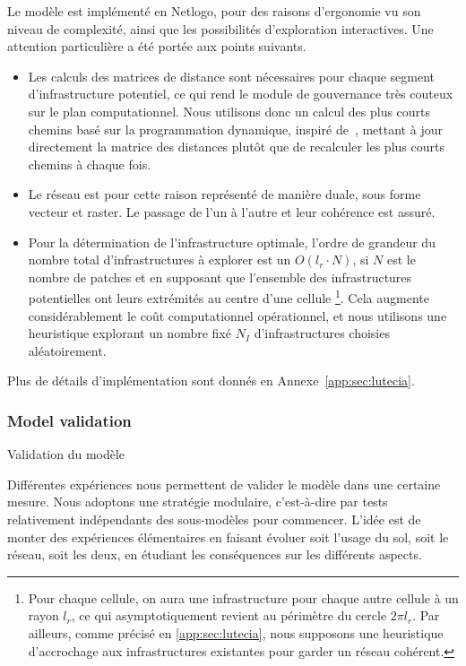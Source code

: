 Le modèle est implémenté en Netlogo, pour des raisons d'ergonomie vu son niveau de complexité, ainsi que les possibilités d'exploration interactives. Une attention particulière a été portée aux points suivants.
\begin{itemize}
	\item Les calculs des matrices de distance sont nécessaires pour chaque segment d'infrastructure potentiel, ce qui rend le module de gouvernance très couteux sur le plan computationnel. Nous utilisons donc un calcul des plus courts chemins basé sur la programmation dynamique, inspiré de~\cite{tretyakov2011fast}, mettant à jour directement la matrice des distances plutôt que de recalculer les plus courts chemins à chaque fois.
	\item Le réseau est pour cette raison représenté de manière duale, sous forme vecteur et raster. Le passage de l'un à l'autre et leur cohérence est assuré.
	\item Pour la détermination de l'infrastructure optimale, l'ordre de grandeur du nombre total d'infrastructures à explorer est un $O(l_r\cdot N)$, si $N$ est le nombre de patches et en supposant que l'ensemble des infrastructures potentielles ont leurs extrémités au centre d'une cellule \footnote{Pour chaque cellule, on aura une infrastructure pour chaque autre cellule à un rayon $l_r$, ce qui asymptotiquement revient au périmètre du cercle $2\pi l_r$. Par ailleurs, comme précisé en \ref{app:sec:lutecia}, nous supposons une heuristique d'accrochage aux infrastructures existantes pour garder un réseau cohérent.}. Cela augmente considérablement le coût computationnel opérationnel, et nous utilisons une heuristique explorant un nombre fixé $N_I$ d'infrastructures choisies aléatoirement.
\end{itemize}


Plus de détails d'implémentation sont donnés en Annexe~\ref{app:sec:lutecia}.




\subsubsection{Model validation}{Validation du modèle}


Différentes expériences nous permettent de valider le modèle dans une certaine mesure. Nous adoptons une stratégie modulaire, c'est-à-dire par tests relativement indépendants des sous-modèles pour commencer. L'idée est de monter des expériences élémentaires en faisant évoluer soit l'usage du sol, soit le réseau, soit les deux, en étudiant les conséquences sur les différents aspects.


